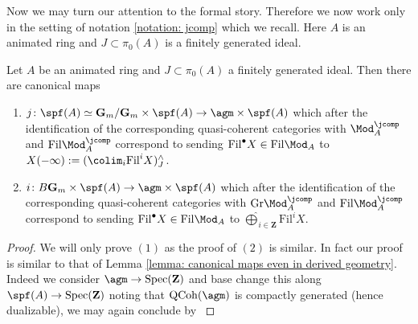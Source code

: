 \documentclass[10pt,reqno]{amsart}
\numberwithin{equation}{section}
\newcommand{\G}{\mathbf{G}}
\newcommand{\ZZ}{\mathbf{Z}}
\newcommand{\spec}{{\mathrm{Spec}}}
\newcommand{\Qcoh}{\mathrm{QCoh}}
\newcommand{\Gr}{\mathrm{Gr}}
\newcommand{\fil}{\mathrm{Fil}}
\begin{document}
Now we may turn our attention to the formal story. Therefore we now work only in the setting of notation \ref{notation: jcomp} which we recall. Here $A$ is an animated ring and $J\subset \pi_0(A)$ is a finitely generated ideal.


\begin{lemma}\label{lemma: canonical maps completed derived geometry}
Let $A$ be an animated ring and $J\subset \pi_0(A)$ a finitely generated ideal. Then there are canonical maps
\begin{enumerate}
    \item $j\colon \spf(A)\simeq \G_m/\G_m\times \spf(A)\to \agm\times \spf(A) $ which after the identification of the corresponding quasi-coherent categories with $\Mod^\jcomp_A$ and $\fil\Mod^\jcomp_A$ correspond to sending $\fil^\bullet X\in \fil\Mod_A$ to $X(-\infty):=(\colim_i \fil^i X)^\wedge_J$.
     \item $i\colon B\G_m\times \spf(A)\to \agm\times \spf(A) $ which after the identification of the corresponding quasi-coherent categories with $\Gr\Mod^\jcomp_A$ and $\fil\Mod^\jcomp_A$ correspond to sending $\fil^\bullet X\in \fil\Mod_A$ to $\widehat{\bigoplus}_{i\in \ZZ} \fil^i X$.
\end{enumerate}
\end{lemma}
\begin{proof}
   We will only prove $(1)$ as the proof of $(2)$ is similar. In fact our proof is similar to that of Lemma \ref{lemma: canonical maps even in derived geometry}. Indeed we consider $\agm\to \spec(\ZZ)$ and base change this along $\spf(A)\to \spec(\ZZ)$ noting that $\Qcoh(\agm)$ is compactly generated (hence dualizable), we may again conclude by \cite[Proposition 3.5.3]{GaitsgoryRozenblyum2017SAGI}

\end{proof}
\end{document}
